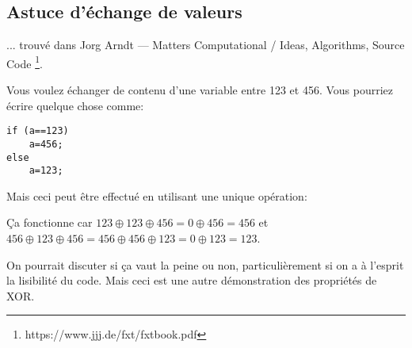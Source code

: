 \subsection{Astuce d'échange de valeurs}

... trouvé dans Jorg Arndt --- Matters Computational / Ideas, Algorithms, Source Code
\footnote{https://www.jjj.de/fxt/fxtbook.pdf}.

Vous voulez échanger de contenu d'une variable entre 123 et 456.
Vous pourriez écrire quelque chose comme:

\begin{lstlisting}
if (a==123)
    a=456;
else
    a=123;
\end{lstlisting}

Mais ceci peut être effectué en utilisant une unique opération:



Ça fonctionne car $123 \oplus 123 \oplus 456=0 \oplus 456=456$ et
$456 \oplus 123 \oplus 456=456 \oplus 456 \oplus 123=0 \oplus 123=123$.

On pourrait discuter si ça vaut la peine ou non, particulièrement si on a à l'esprit
la lisibilité du code.
Mais ceci est une autre démonstration des propriétés de XOR.

